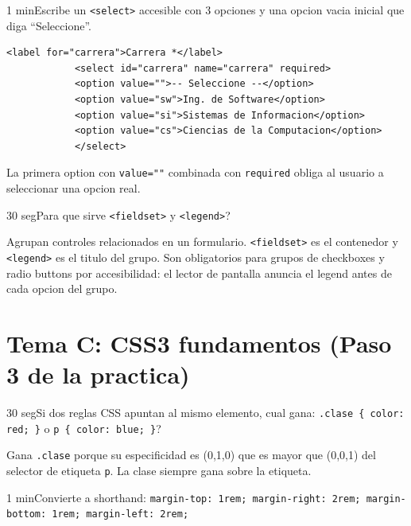 \documentclass[11pt,a4paper]{article}
\newcounter{nej}
\newcommand{\ej}[2]{%
	\stepcounter{nej}%
	\begin{ejercicio}{\arabic{nej}}{#1}#2\end{ejercicio}\vspace{4pt}}
\begin{document}
	\ej{1 min}{Escribe un \texttt{<select>} accesible con 3 opciones y una opcion vacia inicial que diga ``Seleccione''.}
	
	\begin{respuesta}
		\begin{lstlisting}[style=codehtml]
			<label for="carrera">Carrera *</label>
			<select id="carrera" name="carrera" required>
			<option value="">-- Seleccione --</option>
			<option value="sw">Ing. de Software</option>
			<option value="si">Sistemas de Informacion</option>
			<option value="cs">Ciencias de la Computacion</option>
			</select>
		\end{lstlisting}
		La primera option con \texttt{value=""} combinada con \texttt{required} obliga al usuario a seleccionar una opcion real.
	\end{respuesta}
	\vspace{6pt}
	
	\ej{30 seg}{Para que sirve \texttt{<fieldset>} y \texttt{<legend>}?}
	
	\begin{respuesta}
		Agrupan controles relacionados en un formulario. \texttt{<fieldset>} es el contenedor y \texttt{<legend>} es el titulo del grupo. Son obligatorios para grupos de checkboxes y radio buttons por accesibilidad: el lector de pantalla anuncia el legend antes de cada opcion del grupo.
	\end{respuesta}
	\vspace{6pt}
	
	\section{Tema C: CSS3 fundamentos (Paso 3 de la practica)}
	
	\ej{30 seg}{Si dos reglas CSS apuntan al mismo elemento, cual gana: \texttt{.clase \{ color: red; \}} o \texttt{p \{ color: blue; \}}?}
	
	\begin{respuesta}
		Gana \texttt{.clase} porque su especificidad es (0,1,0) que es mayor que (0,0,1) del selector de etiqueta \texttt{p}. La clase siempre gana sobre la etiqueta.
	\end{respuesta}
	\vspace{6pt}
	
	\ej{1 min}{Convierte a shorthand: \texttt{margin-top: 1rem; margin-right: 2rem; margin-bottom: 1rem; margin-left: 2rem;}}
	
\end{document}
